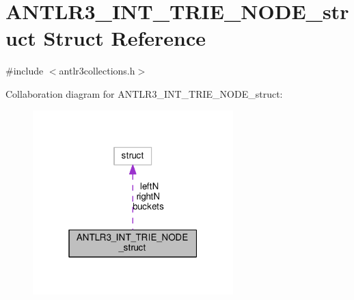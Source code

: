 \hypertarget{struct_a_n_t_l_r3___i_n_t___t_r_i_e___n_o_d_e__struct}{\section{A\-N\-T\-L\-R3\-\_\-\-I\-N\-T\-\_\-\-T\-R\-I\-E\-\_\-\-N\-O\-D\-E\-\_\-struct Struct Reference}
\label{struct_a_n_t_l_r3___i_n_t___t_r_i_e___n_o_d_e__struct}
}


{\ttfamily \#include $<$antlr3collections.\-h$>$}



Collaboration diagram for A\-N\-T\-L\-R3\-\_\-\-I\-N\-T\-\_\-\-T\-R\-I\-E\-\_\-\-N\-O\-D\-E\-\_\-struct\-:
\nopagebreak
\begin{figure}[H]
\begin{center}
\leavevmode
\includegraphics[width=220pt]{struct_a_n_t_l_r3___i_n_t___t_r_i_e___n_o_d_e__struct__coll__graph}
\end{center}
\end{figure}
